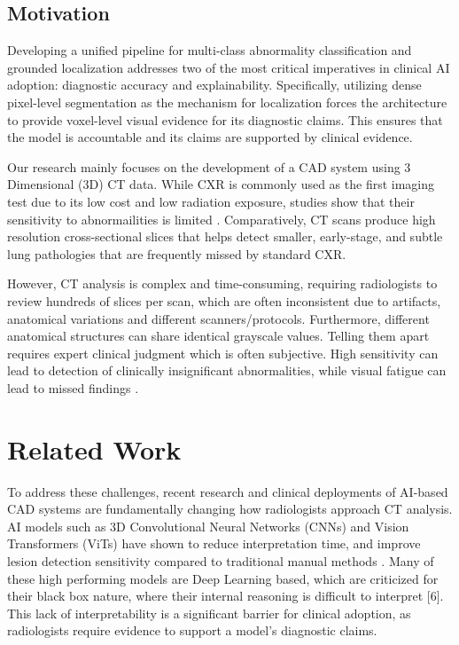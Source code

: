 \documentclass[conference]{IEEEtran}
\begin{document}
\subsection{Motivation}

Developing a unified pipeline for multi-class abnormality classification and grounded
localization addresses two of the most critical imperatives in clinical AI adoption: diagnostic
accuracy and explainability. Specifically, utilizing dense pixel-level segmentation
as the mechanism for localization forces the architecture to provide voxel-level
visual evidence for its diagnostic claims. This ensures that the model is accountable
and its claims are supported by clinical evidence.

Our research mainly focuses on the development of a CAD system using 3 Dimensional (3D)
CT data. While CXR is commonly used as the first imaging test
due to its low cost and low radiation exposure, studies show that their sensitivity to
abnormailities is limited \cite{borakati2020diagnostic}. Comparatively, CT scans produce high resolution cross-sectional
slices that helps detect smaller, early-stage, and subtle lung pathologies that
are frequently missed by standard CXR.

However, CT analysis is complex and time-consuming, requiring radiologists to review
hundreds of slices per scan, which are often inconsistent due to artifacts, anatomical
variations and different scanners/protocols. Furthermore, different anatomical
structures can share identical grayscale values. Telling them apart requires expert
clinical judgment which is often subjective. High sensitivity can lead to detection of
clinically insignificant abnormalities, while visual fatigue can lead to missed findings \cite{mccreadie2009eight}.

\section{Related Work}
To address these challenges, recent research and clinical deployments of AI-based
CAD systems are fundamentally changing how radiologists approach CT analysis. AI
models such as 3D Convolutional Neural Networks (CNNs) and Vision Transformers
(ViTs) have shown to reduce interpretation time, and improve lesion detection sensitivity
compared to traditional manual methods \cite{doi2007computer}. Many of these high performing
models are Deep Learning based, which are criticized for their black box nature, where
their internal reasoning is difficult to interpret [6]. This lack of interpretability is a
significant barrier for clinical adoption, as radiologists require evidence to support a
model's diagnostic claims.
\end{document}
